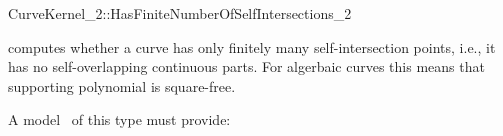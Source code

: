 \begin{ccRefFunctionObjectConcept}{CurveKernel_2::HasFiniteNumberOfSelfIntersections_2}

\ccDefinition
computes whether a curve has only finitely many self-intersection points, i.e., it has no
self-overlapping continuous parts. For algerbaic curves this means that supporting polynomial is 
square-free. 

\ccRefines
{}

\ccTypes
{}
\ccGlue
{}

\ccOperations
{}

A model \ccVar\ of this type must provide:


\ccSeeAlso
{}\\

\end{ccRefFunctionObjectConcept}
